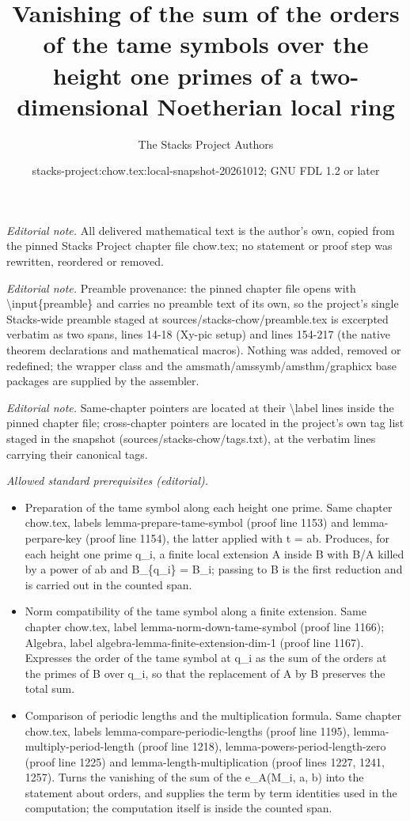 \documentclass[10pt,a4paper]{amsart}
\title{Vanishing of the sum of the orders of the tame symbols over the height one primes of a two-dimensional Noetherian local ring}
\author{The Stacks Project Authors}
\date{stacks-project:chow.tex:local-snapshot-20261012; GNU FDL 1.2 or later}
\theoremstyle{plain}
\theoremstyle{definition}
\theoremstyle{remark}
\numberwithin{equation}{subsection}
\begin{document}
\maketitle
\noindent\textit{Editorial note.} All delivered mathematical text is the author's own, copied from the pinned Stacks Project chapter file chow.tex; no statement or proof step was rewritten, reordered or removed.\par\medskip
\noindent\textit{Editorial note.} Preamble provenance: the pinned chapter file opens with \textbackslash{}input\{preamble\} and carries no preamble text of its own, so the project's single Stacks-wide preamble staged at sources/stacks-chow/preamble.tex is excerpted verbatim as two spans, lines 14-18 (Xy-pic setup) and lines 154-217 (the native theorem declarations and mathematical macros). Nothing was added, removed or redefined; the wrapper class and the amsmath/amssymb/amsthm/graphicx base packages are supplied by the assembler.\par\medskip
\noindent\textit{Editorial note.} Same-chapter pointers are located at their \textbackslash{}label lines inside the pinned chapter file; cross-chapter pointers are located in the project's own tag list staged in the snapshot (sources/stacks-chow/tags.txt), at the verbatim lines carrying their canonical tags.\par\medskip
\noindent\textit{Allowed standard prerequisites (editorial).}\begin{itemize}
\item Preparation of the tame symbol along each height one prime. Same chapter chow.tex, labels lemma-prepare-tame-symbol (proof line 1153) and lemma-perpare-key (proof line 1154), the latter applied with t = ab. Produces, for each height one prime q\_i, a finite local extension A inside B with B/A killed by a power of ab and B\_\{q\_i\} = B\_i; passing to B is the first reduction and is carried out in the counted span.
\item Norm compatibility of the tame symbol along a finite extension. Same chapter chow.tex, label lemma-norm-down-tame-symbol (proof line 1166); Algebra, label algebra-lemma-finite-extension-dim-1 (proof line 1167). Expresses the order of the tame symbol at q\_i as the sum of the orders at the primes of B over q\_i, so that the replacement of A by B preserves the total sum.
\item Comparison of periodic lengths and the multiplication formula. Same chapter chow.tex, labels lemma-compare-periodic-lengths (proof line 1195), lemma-multiply-period-length (proof line 1218), lemma-powers-period-length-zero (proof line 1225) and lemma-length-multiplication (proof lines 1227, 1241, 1257). Turns the vanishing of the sum of the e\_A(M\_i, a, b) into the statement about orders, and supplies the term by term identities used in the computation; the computation itself is inside the counted span.
\end{itemize}\medskip
\end{document}
